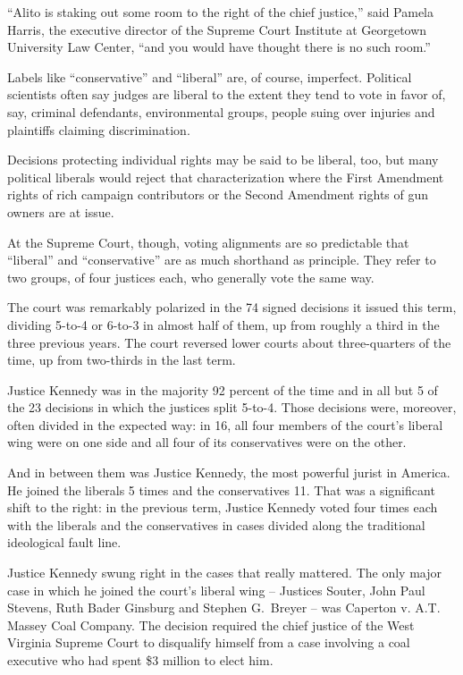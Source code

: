 ﻿\documentclass[12pt]{article}
\begin{document}
``Alito is staking out some room to the right of the chief justice,'' said Pamela Harris, the
executive director of the Supreme Court Institute at Georgetown University Law Center, ``and you
would have thought there is no such room.''

Labels like ``conservative'' and ``liberal'' are, of course, imperfect. Political scientists often
say judges are liberal to the extent they tend to vote in favor of, say, criminal defendants,
environmental groups, people suing over injuries and plaintiffs claiming discrimination.

Decisions protecting individual rights may be said to be liberal, too, but many political liberals
would reject that characterization where the First Amendment rights of rich campaign contributors or
the Second Amendment rights of gun owners are at issue.

At the Supreme Court, though, voting alignments are so predictable that ``liberal'' and
``conservative'' are as much shorthand as principle. They refer to two groups, of four justices
each, who generally vote the same way.

The court was remarkably polarized in the 74 signed decisions it issued this term, dividing 5-to-4
or 6-to-3 in almost half of them, up from roughly a third in the three previous years. The court
reversed lower courts about three-quarters of the time, up from two-thirds in the last term.

Justice Kennedy was in the majority 92 percent of the time and in all but 5 of the 23 decisions in
which the justices split 5-to-4. Those decisions were, moreover, often divided in the expected way:
in 16, all four members of the court's liberal wing were on one side and all four of its
conservatives were on the other.

And in between them was Justice Kennedy, the most powerful jurist in America. He joined the liberals
5 times and the conservatives 11. That was a significant shift to the right: in the previous term,
Justice Kennedy voted four times each with the liberals and the conservatives in cases divided along
the traditional ideological fault line.

Justice Kennedy swung right in the cases that really mattered. The only major case in which he
joined the court's liberal wing -- Justices Souter, John Paul Stevens, Ruth Bader Ginsburg and
Stephen G.~Breyer -- was Caperton v. A.T. Massey Coal Company. The decision required the chief
justice of the West Virginia Supreme Court to disqualify himself from a case involving a coal
executive who had spent \$3 million to elect him.
\end{document}
